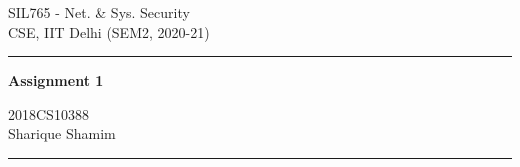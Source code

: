 \documentclass{exam}
\begin{document}
\begin{minipage}{0.295\textwidth} %
\raggedright
SIL765 - Net. \& Sys. Security\\ %
\footnotesize %
CSE, IIT Delhi (SEM2, 2020-21) %
\medskip\hrule
\end{minipage}
\begin{minipage}{0.4\textwidth} %
\centering 
\large %
\textbf{Assignment 1}\\ %
\normalsize %
\end{minipage}
\begin{minipage}{0.295\textwidth} %
\raggedleft
2018CS10388\\ %
\footnotesize
Sharique Shamim %
\medskip\hrule
\end{minipage}
\vspace{0.1in}
\end{document}
